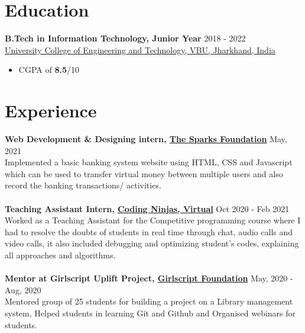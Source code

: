 \documentclass[margin, centered]{res}
\begin{document}
\begin{resume}

\section{Education}
\textbf{B.Tech in Information Technology, Junior Year} \hfill 2018 - 2022 \\
\href{http://ucetvbu.ac.in/}{University College of Engineering and Technology, VBU, Jharkhand, India}
\begin{itemize}
 \item CGPA of \textbf{8.5}/10
\end{itemize}

\section{Experience}
\textbf{Web Development & Designing intern, \href{https://www.thesparksfoundationsingapore.org/}{The Sparks Foundation}} \hfill May, 2021\\
Implemented a basic banking system website using HTML, CSS and Javascript which can be used to transfer virtual money between multiple users and also record the banking transactions/ activities.\\
\\
\textbf{Teaching Assistant Intern, \href{https://www.codingninjas.com/}{Coding Ninjas, Virtual}} \hfill Oct 2020 - Feb 2021 \\
Worked as a Teaching Assistant for the Competitive programming course where I had to resolve the doubts of students in real time through chat, audio calls and video calls, it also included debugging and optimizing student's codes, explaining all approaches and algorithms.\\
\\
\textbf{Mentor at Girlscript Uplift Project, \href{https://www.girlscript.tech/home}{Girlscript Foundation}} \hfill May, 2020 - Aug, 2020 \\
Mentored group of 25 students for building a project on a Library management system, Helped students in learning Git and Github and Organised webinars for students.

\end{resume}
\end{document}
